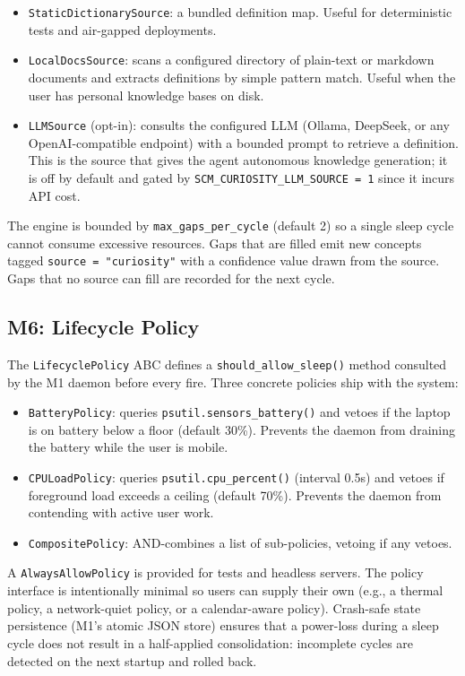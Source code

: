 \documentclass[11pt,twocolumn]{article}
\begin{document}
\begin{itemize}[leftmargin=*]
\item \texttt{StaticDictionarySource}: a bundled definition map. Useful for deterministic tests and air-gapped deployments.
\item \texttt{LocalDocsSource}: scans a configured directory of plain-text or markdown documents and extracts definitions by simple pattern match. Useful when the user has personal knowledge bases on disk.
\item \texttt{LLMSource} (opt-in): consults the configured LLM (Ollama, DeepSeek, or any OpenAI-compatible endpoint) with a bounded prompt to retrieve a definition. This is the source that gives the agent autonomous knowledge generation; it is off by default and gated by \texttt{SCM\_CURIOSITY\_LLM\_SOURCE = 1} since it incurs API cost.
\end{itemize}

The engine is bounded by \texttt{max\_gaps\_per\_cycle} (default 2) so a single sleep cycle cannot consume excessive resources. Gaps that are filled emit new concepts tagged \texttt{source = "curiosity"} with a confidence value drawn from the source. Gaps that no source can fill are recorded for the next cycle.

\subsection{M6: Lifecycle Policy}

The \texttt{LifecyclePolicy} ABC defines a \texttt{should\_allow\_sleep()} method consulted by the M1 daemon before every fire. Three concrete policies ship with the system:

\begin{itemize}[leftmargin=*]
\item \texttt{BatteryPolicy}: queries \texttt{psutil.sensors\_battery()} and vetoes if the laptop is on battery below a floor (default 30\%). Prevents the daemon from draining the battery while the user is mobile.
\item \texttt{CPULoadPolicy}: queries \texttt{psutil.cpu\_percent()} (interval 0.5s) and vetoes if foreground load exceeds a ceiling (default 70\%). Prevents the daemon from contending with active user work.
\item \texttt{CompositePolicy}: AND-combines a list of sub-policies, vetoing if any vetoes.
\end{itemize}

A \texttt{AlwaysAllowPolicy} is provided for tests and headless servers. The policy interface is intentionally minimal so users can supply their own (e.g., a thermal policy, a network-quiet policy, or a calendar-aware policy). Crash-safe state persistence (M1's atomic JSON store) ensures that a power-loss during a sleep cycle does not result in a half-applied consolidation: incomplete cycles are detected on the next startup and rolled back.
\end{document}
